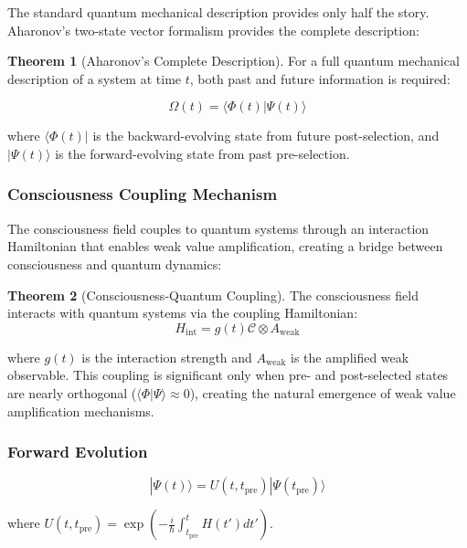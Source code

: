 \documentclass[12pt,a4paper]{article}
\theoremstyle{definition}
\newtheorem{theorem}{Theorem}[section]
\begin{document}
The standard quantum mechanical description provides only half the story. Aharonov's two-state vector formalism provides the complete description:

\begin{theorem}[Aharonov's Complete Description]
For a full quantum mechanical description of a system at time $t$, both past and future information is required:

\begin{equation}
\Omega(t) = \langle \Phi(t)| \Psi(t) \rangle
\end{equation}

where $\langle \Phi(t)|$ is the backward-evolving state from future post-selection, and $|\Psi(t)\rangle$ is the forward-evolving state from past pre-selection.
\end{theorem}

\subsubsection{Consciousness Coupling Mechanism}

The consciousness field couples to quantum systems through an interaction Hamiltonian that enables weak value amplification, creating a bridge between consciousness and quantum dynamics:

\begin{theorem}[Consciousness-Quantum Coupling]
The consciousness field interacts with quantum systems via the coupling Hamiltonian:
\begin{equation}
H_{\text{int}} = g(t) \mathcal{C} \otimes A_{\text{weak}}
\end{equation}

where $g(t)$ is the interaction strength and $A_{\text{weak}}$ is the amplified weak observable. This coupling is significant only when pre- and post-selected states are nearly orthogonal ($\langle\Phi|\Psi\rangle \approx 0$), creating the natural emergence of weak value amplification mechanisms.
\end{theorem}

\subsubsection{Forward Evolution}

\begin{equation}
|\Psi(t)\rangle = U(t, t_{\text{pre}}) |\Psi(t_{\text{pre}})\rangle
\end{equation}

where $U(t, t_{\text{pre}}) = \exp\left(-\frac{i}{\hbar} \int_{t_{\text{pre}}}^t H(t') dt'\right)$.
\end{document}

